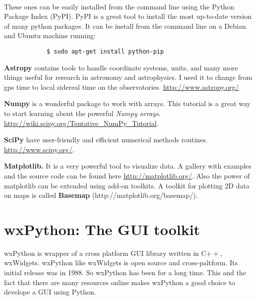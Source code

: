 \documentclass[11pt,fleqn]{book} %
\begin{document}
\vspace{.5 cm}
\begin{description}
    
        \item[Packages:] \hfill
        	\\
        These ones can be easily installed from the command line using the Python Package Index (PyPI). PyPI is a great tool to install the most up-to-date version of many python packages. It can be install from the command line on a Debian and Ubuntu machine running:
        \begin{verbatim}
        	$ sudo apt-get install python-pip
        \end{verbatim}
        	
		\item \textbf{Astropy} contains tools to handle coordinate systems, units, and many more things useful for research in astronomy and astrophysics. I used it to change from gps time to local sidereal time on the observatories. \url{http://www.astropy.org/}
		\item \textbf{Numpy} is a wonderful package to work with arrays. This tutorial is a great way to start learning about the powerful \emph{Numpy arrays}. \url{http://wiki.scipy.org/Tentative_NumPy_Tutorial}.
		\item \textbf{SciPy} have user-friendly and efficient numerical methods routines. \url{http://www.scipy.org/}.
		\item \textbf{Matplotlib.} It is a very powerful tool to visualize data. A gallery with examples and the source code can be found here \url{http://matplotlib.org/}. Also the power of matplotlib can be extended using add-on toolkits. A toolkit for plotting 2D data on maps is called \textbf{Basemap} (http://matplotlib.org/basemap/).
\end{description}

\section{wxPython: The GUI toolkit}

wxPython is wrapper of a cross platform GUI library written in C$++$, wxWidgets. wxPython like wxWidgets is open source and cross-paltform. Its initial release was in 1988. So wxPython has been for a long time. This and the fact that there are many resources online makes wxPython a good choice to develope a GUI using Python. 
\end{document}
